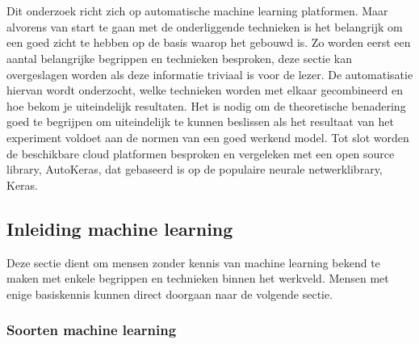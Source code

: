 \chapter{}
\label{ch:stand-van-zaken}



Dit onderzoek richt zich op automatische machine learning platformen. Maar alvorens van start te gaan met de onderliggende technieken is het belangrijk om een goed zicht te hebben op de basis waarop het gebouwd is. Zo worden eerst een aantal belangrijke begrippen en technieken besproken, deze sectie kan overgeslagen worden als deze informatie triviaal is voor de lezer. De automatisatie hiervan wordt onderzocht, welke technieken worden met elkaar gecombineerd en hoe bekom je uiteindelijk resultaten. Het is nodig om de theoretische benadering goed te begrijpen om uiteindelijk te kunnen beslissen als het resultaat van het experiment voldoet aan de normen van een goed werkend model. Tot slot worden de beschikbare cloud platformen besproken en vergeleken met een open source library, AutoKeras, dat gebaseerd is op de populaire neurale netwerklibrary, Keras. 

\section{Inleiding machine learning}
\label{sec:inl-machine-learning}

Deze sectie dient om mensen zonder kennis van machine learning bekend te maken met enkele begrippen en technieken binnen het werkveld. Mensen met enige basiskennis kunnen direct doorgaan naar de volgende sectie.

\subsection{Soorten machine learning}
\label{subsec:soorten-machine-learning}

